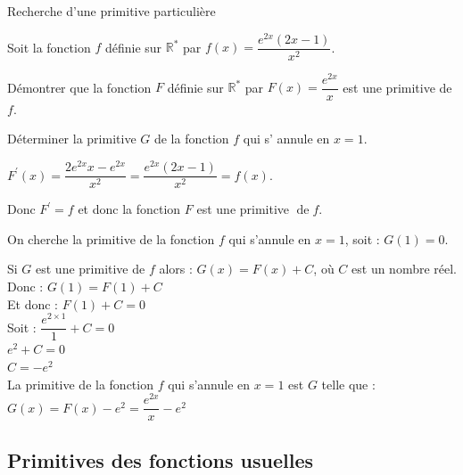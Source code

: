 \begin{bmethodet}{Recherche d'une primitive particulière}
	
	Soit la fonction $f$ définie sur $\mathbb{R}^{*}$ par $f(x)=\dfrac{e^{2 x}(2 x-1)}{x^{2}}$.
	\begin{enumMet}
		\item Démontrer que la fonction $F$ définie sur $\mathbb{R}^{*}$ par $F(x)=\dfrac{e^{2 x}}{x}$ est une primitive de $f$.\\
		\item Déterminer la primitive $G$ de la fonction $f$ qui s' annule en $x=1$.
	\end{enumMet}
	
	
	\begin{enumMet}
		\item $F^{\prime}(x)=\dfrac{2 e^{2 x} x-e^{2 x}}{x^{2}}=\dfrac{e^{2 x}(2 x-1)}{x^{2}}=f(x)$.
		
		Donc $F^{\prime}=f$ et donc la fonction $F$ est une primitive $\operatorname{de} f$.\\
		\item On cherche la primitive de la fonction $f$ qui s'annule en $x=1$, soit : $G(1)=0$.
		
		Si $G$ est une primitive de $f$ alors : $G(x)=F(x)+C$, où $C$ est un nombre réel.\\
		Donc : $G(1)=F(1)+C$\\
		Et donc : $F(1)+C=0$\\
		Soit : $\dfrac{e^{2 \times 1}}{1}+C=0$\\
		$e^{2}+C=0$\\
		$C=-e^{2}$\\
		La primitive de la fonction $f$ qui s'annule en $x=1$ est $G$ telle que :\\
		$G(x)=F(x)-e^{2}=\dfrac{e^{2 x}}{x}-e^{2}$
	\end{enumMet}
\end{bmethodet}

\subsection{Primitives des fonctions usuelles}

